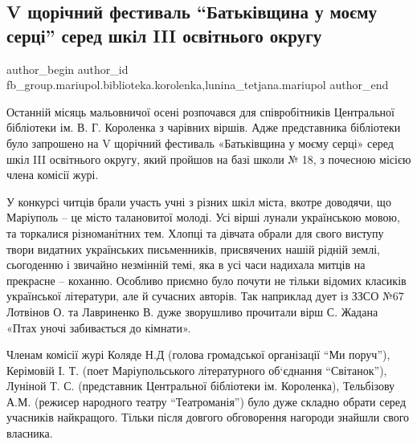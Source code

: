  
 
 
 
 

\subsection{V щорічний фестиваль \enquote{Батьківщина у моєму серці} серед шкіл III освітнього округу}
\label{sec:04_11_2018.fb.fb_group.mariupol.biblioteka.korolenka.1.v_shchor_chnii_festi}
 
\ifcmt
 author_begin
   author_id fb_group.mariupol.biblioteka.korolenka,lunina_tetjana.mariupol
 author_end
\fi

Останній місяць мальовничої осені  розпочався для співробітників Центральної
бібліотеки ім. В. Г. Короленка з чарівних віршів. Адже представника бібліотеки
було запрошено на V щорічний фестиваль «Батьківщина у моєму серці» серед шкіл
III освітнього округу, який пройшов на базі школи № 18, з почесною місією члена
комісії журі.  

У конкурсі читців брали участь учні з різних шкіл міста, вкотре доводячи, що
Маріуполь – це місто талановитої молоді. Усі вірші лунали українською мовою, та
торкалися різноманітних тем. Хлопці та дівчата обрали для свого виступу твори
видатних українських письменників, присвячених нашій рідній землі, сьогоденню і
звичайно  незмінній темі, яка в усі часи надихала митців на прекрасне –
коханню. Особливо приємно було почути не тільки відомих класиків української
літератури, але  й сучасних авторів. Так наприклад дует із ЗЗСО №67 Лотвінов О.
та Лавриненко В. дуже зворушливо прочитали вірш С. Жадана «Птах уночі
забивається до кімнати».

Членам комісії журі Коляде Н.Д (голова громадської організації \enquote{Ми поруч}),
Керімовій І. Т. (поет Маріупольського літературного об`єднання \enquote{Світанок}),
Луніной Т. С. (представник Центральної бібліотеки ім. Короленка), Тельбізову А.М.
(режисер народного театру \enquote{Театроманія})  було дуже складно обрати серед
учасників найкращого. Тільки після довгого обговорення нагороди знайшли свого
власника. 

